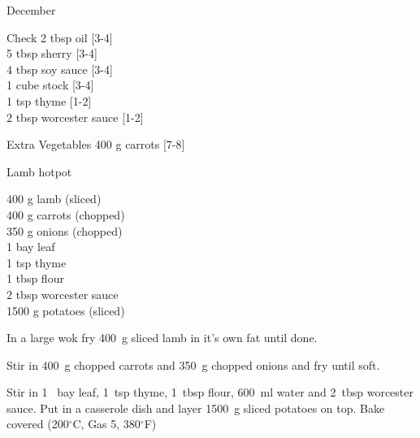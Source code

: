 \begin{menu}{December}
\begin{shoppinglist}{Check}
      2 tbsp oil 
        {\scriptsize[3-4]}\\
      5 tbsp sherry 
        {\scriptsize[3-4]}\\
      4 tbsp soy sauce 
        {\scriptsize[3-4]}\\
      1 cube stock 
        {\scriptsize[3-4]}\\
      1 tsp thyme 
        {\scriptsize[1-2]}\\
      2 tbsp worcester sauce 
        {\scriptsize[1-2]}\\
      \end{shoppinglist}%
      \begin{shoppinglist}{Extra Vegetables}
      400 g carrots 
        {\scriptsize[7-8]}\\
      \end{shoppinglist}%
      \par\vfil %
    \vfil\clearpage
  
    \begin{recipe}{2}{Lamb hotpot}%
    
		\begin{ingredients}
		400 g lamb (sliced) \\
	400 g carrots (chopped) \\
	350 g onions (chopped) \\
	1  bay leaf  \\
	1 tsp thyme  \\
	1 tbsp flour  \\
	2 tbsp worcester sauce  \\
	1500 g potatoes (sliced) \\
	
		\end{ingredients}
	
    \begin{instructions}
    \item 
        In a large wok fry
        400~g sliced lamb
        in it's own fat until done.
      \item 
        Stir in
        400~g chopped carrots
        and
        350~g chopped onions
        and fry until soft.
      \item 
        Stir in
        1~  bay leaf,
        1~tsp  thyme,
        1~tbsp  flour,
        600~ml  water
        and
        2~tbsp  worcester sauce.
        Put in a casserole dish and
        layer 1500~g sliced potatoes on top.
        Bake covered 
      (200$^{\circ}$C, Gas 5, 380$^{\circ}$F)
    

\end{instructions}
\end{recipe}
\end{menu}
